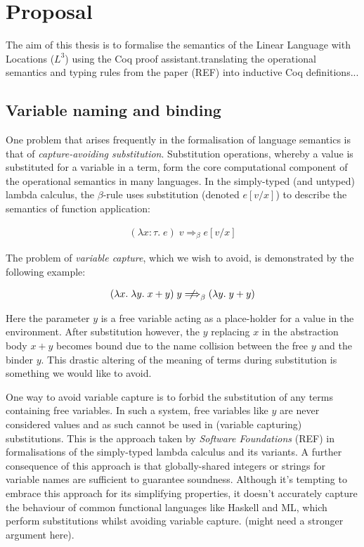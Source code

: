 \documentclass[]{unswthesis}
\begin{document}
\chapter{Proposal}

The aim of this thesis is to formalise the semantics of the Linear Language with Locations ($L^3$) using the Coq proof assistant.translating the operational semantics and typing rules from the paper (REF) into inductive Coq definitions...


\section{Variable naming and binding}

One problem that arises frequently in the formalisation of language semantics is that of \textit{capture-avoiding substitution}. Substitution operations, whereby a value is substituted for a variable in a term, form the core computational component of the operational semantics in many languages. In the simply-typed (and untyped) lambda calculus, the $\beta$-rule uses substitution (denoted $e[v/x]$) to describe the semantics of function application:

\begin{eqnarray*}
(\lambda x : \tau. \; e) \; v \Longrightarrow_\beta e[v/x]
\end{eqnarray*}

The problem of \textit{variable capture}, which we wish to avoid, is demonstrated by the following example:

\begin{eqnarray*}
(\lambda x. \; \lambda y. \; x + y) \; y \; {\centernot\Longrightarrow}_\beta \; (\lambda y. \; y + y)
\end{eqnarray*}

Here the parameter $y$ is a free variable acting as a place-holder for a value in the environment. After substitution however, the $y$ replacing $x$ in the abstraction body $x + y$ becomes bound due to the name collision between the free $y$ and the binder $y$. This drastic altering of the meaning of terms during substitution is something we would like to avoid.

One way to avoid variable capture is to forbid the substitution of any terms containing free variables. In such a system, free variables like $y$ are never considered values and as such cannot be used in (variable capturing) substitutions. This is the approach taken by \textit{Software Foundations} (REF) in formalisations of the simply-typed lambda calculus and its variants. A further consequence of this approach is that globally-shared integers or strings for variable names are sufficient to guarantee soundness. Although it's tempting to embrace this approach for its simplifying properties, it doesn't accurately capture the behaviour of common functional languages like Haskell and ML, which perform substitutions whilst avoiding variable capture. (might need a stronger argument here).
\end{document}
